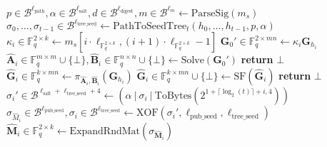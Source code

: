 \begin{algorithm}[H]
\begin{algorithmic}[1]
\State $p \in \mathcal{B}^{\ell_\text{path}}, \alpha \in \mathcal{B}^{\ell_\text{salt}}, d \in \mathcal{B}^{\ell_\text{digest}}, m \in \mathcal{B}^{\ell_m} \gets \text{ParseSig}(m_s)$
\State $\sigma_0, \ldots, \sigma_{t-1} \in \mathcal{B}^{\ell_\text{tree\_seed}} \gets \text{PathToSeedTree}_t(h_0, \ldots, h_{t-1}, p, \alpha)$
        \State $\kappa_i \in \mathds{F}_q^{2 \times k} \gets m_s[i \cdot \ell_{\mathds{F}_q^{2 \times k}}, (i + 1) \cdot \ell_{\mathds{F}_q^{2 \times k}} - 1]$
        \State $\textbf{G}_0' \in \mathds{F}_q^{2 \times mn} \gets \kappa_i \textbf{G}_{h_i}$
        \State $\hat{\textbf{A}}_i \in \mathds{F}_q^{m \times m} \cup \{\bot\}, \hat{\textbf{B}}_i \in \mathds{F}_q^{n \times n} \cup \{\bot\} \gets \text{Solve}(\textbf{G}_0')$
            \State \textbf{return} $\bot$
        \EndIf
        \State $\hat{\textbf{G}}_i \in \mathds{F}_q^{k \times mn} \gets \pi_{\hat{\textbf{A}}_i, \hat{\textbf{B}}_i}(\textbf{G}_{h_i})$
        \State $\hat{\textbf{G}}_i \in \mathds{F}_q^{k \times mn} \cup \{\bot\} \gets \text{SF}(\hat{\textbf{G}}_i)$
            \State \textbf{return} $\bot$
        \EndIf
    \Else
        \State $\sigma_i' \in \mathcal{B}^{\ell_\text{salt} + \ell_\text{tree\_seed} + 4} \gets (\alpha~|~\sigma_i~|~\text{ToBytes}(2^{1 + \lceil \log_2(t) \rceil + i, 4}))$
        \State $\sigma_{\hat{M}_i} \in \mathcal{B}^{\ell_\text{pub\_seed}}, \sigma_i \in \mathcal{B}^{\ell_\text{tree\_seed}} \gets \text{XOF}(\sigma_i', \ell_\text{pub\_seed}, \ell_\text{tree\_seed})$
        \State $\hat{\textbf{M}}_i \in \mathds{F}_q^{2 \times k} \gets \text{ExpandRndMat}(\sigma_{\hat{\textbf{M}}_i})$

\end{algorithmic}
\end{algorithm}
